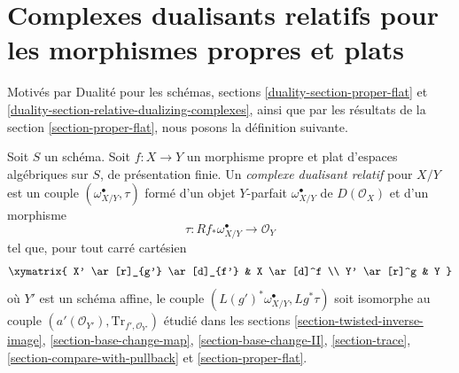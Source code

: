  
\section{Complexes dualisants relatifs pour les morphismes propres et plats}
\label{section-relative-dualizing-proper-flat}

\noindent
Motivés par Dualité pour les schémas, sections
\ref{duality-section-proper-flat} et
\ref{duality-section-relative-dualizing-complexes},
ainsi que par les résultats de la
section \ref{section-proper-flat},
nous posons la définition suivante.

\begin{definition}
\label{definition-relative-dualizing-proper-flat}
Soit $S$ un schéma. Soit $f : X \to Y$ un morphisme propre et plat
d'espaces algébriques sur $S$, de présentation finie.
Un {\it complexe dualisant relatif} pour $X/Y$ est un couple
$(\omega_{X/Y}^\bullet, \tau)$ formé d'un
objet $Y$-parfait $\omega_{X/Y}^\bullet$ de $D(\mathcal{O}_X)$
et d'un morphisme
$$
\tau : Rf_*\omega_{X/Y}^\bullet \longrightarrow \mathcal{O}_Y
$$
tel que, pour tout carré cartésien
$$
\xymatrix{
X' \ar[r]_{g'} \ar[d]_{f'} & X \ar[d]^f \\
Y' \ar[r]^g & Y
}
$$
où $Y'$ est un schéma affine, le couple
$(L(g')^*\omega_{X/Y}^\bullet, Lg^*\tau)$
soit isomorphe au couple
$(a'(\mathcal{O}_{Y'}), \text{Tr}_{f', \mathcal{O}_{Y'}})$
étudié dans les sections
\ref{section-twisted-inverse-image},
\ref{section-base-change-map},
\ref{section-base-change-II},
\ref{section-trace},
\ref{section-compare-with-pullback} et
\ref{section-proper-flat}.
\end{definition}

